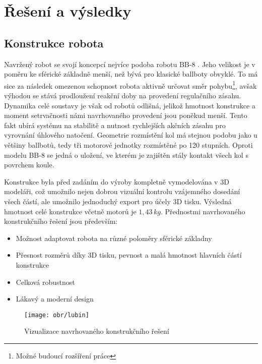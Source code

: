 \chapter{Řešení a výsledky}
\label{reseni}

\section{Konstrukce robota}
\label{construction}

Navržený robot se svojí koncepcí nejvíce podoba robotu BB-8 \cite{bb8}. Jeho velikost je v poměru ke sférické základně menší, než bývá pro klasické ballboty obvyklé. To má sice za následek omezenou schopnost robota aktivně určovat směr pohybu\footnote{Možné budoucí rozšíření práce}, avšak výhodou se stává prodloužení reakční doby na provedení regulačního zásahu. Dynamika celé soustavy je však od robotů \cite{rezero} \cite{tgu} \cite{cmu} \cite{kuala} odlišná, jelikož hmotnost konstrukce a moment setrvačnosti námi navrhovaného provedení jsou poněkud menší. Tento fakt ubírá systému na stabilitě a nutnost rychlejších akčních zásahu pro vyrovnání úhlového natočení.
Geometrie rozmístění kol má stejnou podobu jako u většiny ballbotů, tedy tři motorové jednotky rozmístěné po 120 stupních. Oproti modelu BB-8 se jedná o uložení, ve kterém je zajištěn stály kontakt všech kol s povrchem koule. 

Konstrukce byla před zadáním do výroby kompletně vymodelována v 3D modeláři, což umožnilo nejen dobrou vizuální kontrolu vzájemného dosedání všech částí, ale umožnilo jednoduchý export pro účely 3D tisku. Výsledná hmotnost celé konstrukce včetně motorů je $1,43\,kg$. 
\vspace{5mm}
Přednostmi navrhovaného konstrukčního řešení jsou především:

\begin{itemize}

\item Možnost adaptovat robota na různé poloměry sférické základny 
\item Přesnost rozměrů díky 3D tisku, pevnost a malá hmotnost hlavních částí konstrukce
\item Celková robustnost
\item Lákavý a moderní design
\end{itemize}
\begin{figure}[hb]
\begin{center}
\texttt{[image: obr/lubin]}
\end{center}
\vspace{3mm}
\caption{Vizualizace navrhovaného konstrukčního řešení}
\label{konstro}
\end{figure}

